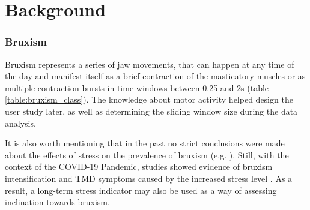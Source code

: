 \chapter{Background}
\label{ch:Background}

\subsection{Bruxism}

Bruxism represents a series of jaw movements, that can happen at any time of the day and manifest itself as a brief contraction of the masticatory muscles or as multiple contraction bursts in time windows between 0.25 and 2s (table \ref{table:bruxism_class}). The knowledge about motor activity helped design the user study later, as well as determining the sliding window size during the data analysis. 

It is also worth mentioning that in the past no strict conclusions were made about the effects of stress on the prevalence of bruxism (e.g. \cite{smardz2019correlation}). Still, with the context of the COVID-19 Pandemic, studies showed evidence of bruxism intensification and TMD symptoms caused by the increased stress level \cite{emodi2020temporomandibular} \cite{almeida2020psychosocial}. As a result, a long-term stress indicator may also be used as a way of assessing inclination towards bruxism.

